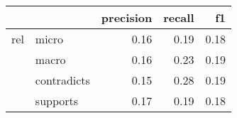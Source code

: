 \begin{tabular}{llrrr}
\toprule
    &          &  precision &  recall &   f1 \\
\midrule
rel & micro &       0.16 &    0.19 & 0.18 \\
    & macro &       0.16 &    0.23 & 0.19 \\
    & contradicts &       0.15 &    0.28 & 0.19 \\
    & supports &       0.17 &    0.19 & 0.18 \\
\bottomrule
\end{tabular}
